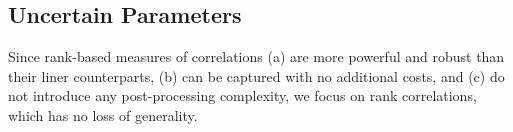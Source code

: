 \subsection{Uncertain Parameters}
Since rank-based measures of correlations (a) are more powerful and robust than their liner counterparts, (b) can be captured with no additional costs, and (c) do not introduce any post-processing complexity, we focus on rank correlations, which has no loss of generality.
